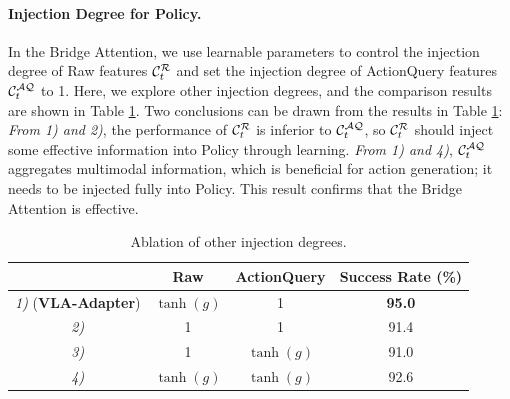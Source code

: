 \paragraph{Injection Degree for Policy.}\label{sec453}
In the Bridge Attention, we use learnable parameters to control the injection degree of Raw features $\mathcal{{\cal C}}_t^\mathcal{R}$ and set the injection degree of ActionQuery features $\mathcal{{\cal C}}_t^\mathcal{AQ}$ to 1. Here, we explore other injection degrees, and the comparison results are shown in Table \ref{Table_injection}. Two conclusions can be drawn from the results in Table \ref{Table_injection}:
\textit{From 1) and 2)}, the performance of $\mathcal{{\cal C}}_t^\mathcal{R}$ is inferior to $\mathcal{{\cal C}}_t^\mathcal{AQ}$, so $\mathcal{{\cal C}}_t^\mathcal{R}$ should inject some effective information into Policy through learning.
\textit{From 1) and 4)}, $\mathcal{{\cal C}}_t^\mathcal{AQ}$ aggregates multimodal information, which is beneficial for action generation; it needs to be injected fully into Policy. This result confirms that the Bridge Attention is effective.

\begin{table}[htbp]
	\centering
	\caption{Ablation of other injection degrees.}\label{Table_injection}%
	\begin{tabular}{c|ccc}
		\toprule[1pt]
		&Raw   & ActionQuery    & Success Rate (\%) \\
		\midrule[0.5pt]
		\textit{1)} (\textbf{VLA-Adapter})&$\tanh(g)$  & 1 & \textbf{95.0} \\
		\textit{2)}&1 & 1 & 91.4 \\
		\textit{3)}&1 & $\tanh(g)$  & 91.0 \\
		\textit{4)}&$\tanh(g)$  & $\tanh(g)$  & 92.6 \\
		\bottomrule[1pt]
	\end{tabular}%
\end{table}%